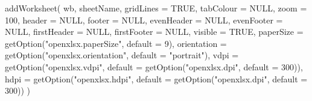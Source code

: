 \documentclass[
]{book}
\newenvironment{Shaded}{\begin{snugshade}}{\end{snugshade}}
\newcommand{\AttributeTok}[1]{\textcolor[rgb]{0.77,0.63,0.00}{#1}}
\newcommand{\ConstantTok}[1]{\textcolor[rgb]{0.00,0.00,0.00}{#1}}
\newcommand{\DecValTok}[1]{\textcolor[rgb]{0.00,0.00,0.81}{#1}}
\newcommand{\FunctionTok}[1]{\textcolor[rgb]{0.00,0.00,0.00}{#1}}
\newcommand{\NormalTok}[1]{#1}
\newcommand{\StringTok}[1]{\textcolor[rgb]{0.31,0.60,0.02}{#1}}
\begin{document}
\begin{Shaded}
\begin{Highlighting}[]
\FunctionTok{addWorksheet}\NormalTok{(}
\NormalTok{  wb,}
\NormalTok{  sheetName,}
  \AttributeTok{gridLines =} \ConstantTok{TRUE}\NormalTok{,}
  \AttributeTok{tabColour =} \ConstantTok{NULL}\NormalTok{,}
  \AttributeTok{zoom =} \DecValTok{100}\NormalTok{,}
  \AttributeTok{header =} \ConstantTok{NULL}\NormalTok{,}
  \AttributeTok{footer =} \ConstantTok{NULL}\NormalTok{,}
  \AttributeTok{evenHeader =} \ConstantTok{NULL}\NormalTok{,}
  \AttributeTok{evenFooter =} \ConstantTok{NULL}\NormalTok{,}
  \AttributeTok{firstHeader =} \ConstantTok{NULL}\NormalTok{,}
  \AttributeTok{firstFooter =} \ConstantTok{NULL}\NormalTok{,}
  \AttributeTok{visible =} \ConstantTok{TRUE}\NormalTok{,}
  \AttributeTok{paperSize =} \FunctionTok{getOption}\NormalTok{(}\StringTok{"openxlsx.paperSize"}\NormalTok{, }\AttributeTok{default =} \DecValTok{9}\NormalTok{),}
  \AttributeTok{orientation =} \FunctionTok{getOption}\NormalTok{(}\StringTok{"openxlsx.orientation"}\NormalTok{, }\AttributeTok{default =} \StringTok{"portrait"}\NormalTok{),}
  \AttributeTok{vdpi =} \FunctionTok{getOption}\NormalTok{(}\StringTok{"openxlsx.vdpi"}\NormalTok{, }\AttributeTok{default =} \FunctionTok{getOption}\NormalTok{(}\StringTok{"openxlsx.dpi"}\NormalTok{, }\AttributeTok{default =} \DecValTok{300}\NormalTok{)),}
  \AttributeTok{hdpi =} \FunctionTok{getOption}\NormalTok{(}\StringTok{"openxlsx.hdpi"}\NormalTok{, }\AttributeTok{default =} \FunctionTok{getOption}\NormalTok{(}\StringTok{"openxlsx.dpi"}\NormalTok{, }\AttributeTok{default =} \DecValTok{300}\NormalTok{))}
\NormalTok{)}
\end{Highlighting}
\end{Shaded}
\end{document}
